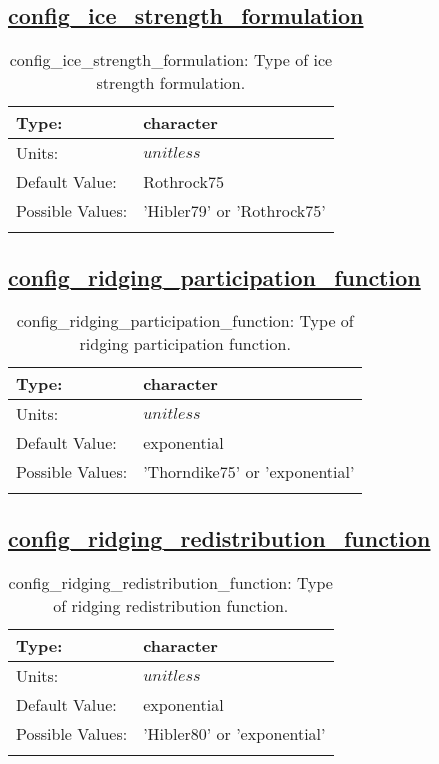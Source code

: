 \subsection[config\_ice\_strength\_formulation]{\hyperref[sec:nm_tab_ridging]{config\_ice\_strength\_formulation}}
\label{subsec:nm_sec_config_ice_strength_formulation}
\begin{center}
\begin{longtable}{| p{2.0in} || p{4.0in} |}
    \hline
    Type: & character \\
    \hline
    Units: & $unitless$ \\
    \hline
    Default Value: & Rothrock75 \\
    \hline
    Possible Values: & 'Hibler79' or 'Rothrock75' \\
    \hline
    \caption{config\_ice\_strength\_formulation: Type of ice strength formulation.}
\end{longtable}
\end{center}
\subsection[config\_ridging\_participation\_function]{\hyperref[sec:nm_tab_ridging]{config\_ridging\_participation\_function}}
\label{subsec:nm_sec_config_ridging_participation_function}
\begin{center}
\begin{longtable}{| p{2.0in} || p{4.0in} |}
    \hline
    Type: & character \\
    \hline
    Units: & $unitless$ \\
    \hline
    Default Value: & exponential \\
    \hline
    Possible Values: & 'Thorndike75' or 'exponential' \\
    \hline
    \caption{config\_ridging\_participation\_function: Type of ridging participation function.}
\end{longtable}
\end{center}
\subsection[config\_ridging\_redistribution\_function]{\hyperref[sec:nm_tab_ridging]{config\_ridging\_redistribution\_function}}
\label{subsec:nm_sec_config_ridging_redistribution_function}
\begin{center}
\begin{longtable}{| p{2.0in} || p{4.0in} |}
    \hline
    Type: & character \\
    \hline
    Units: & $unitless$ \\
    \hline
    Default Value: & exponential \\
    \hline
    Possible Values: & 'Hibler80' or 'exponential' \\
    \hline
    \caption{config\_ridging\_redistribution\_function: Type of ridging redistribution function.}
\end{longtable}
\end{center}
